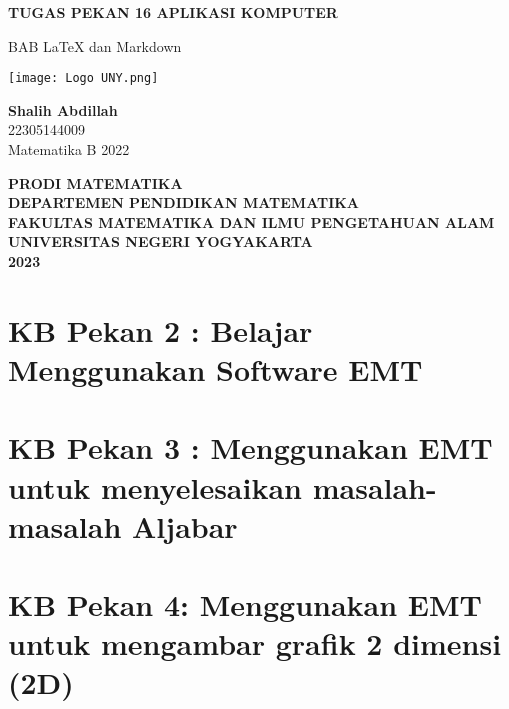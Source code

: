 \documentclass{report}
\begin{document}
\begin{titlepage}
    \begin{center}
        \vspace*{0,2cm}

        \Huge
        \textbf{TUGAS PEKAN 16 APLIKASI KOMPUTER}
        
        \vspace{1cm}
        
        \LARGE
        BAB LaTeX dan Markdown  
        
        \vspace{1cm}
        
        \texttt{[image: Logo UNY.png]}

        \vspace{1cm}
        
        \textbf{Shalih Abdillah}\\
        22305144009\\
        Matematika B 2022
        
        \vspace{2cm}
        
        \Large
        \textbf{PRODI MATEMATIKA}\\
        \textbf{DEPARTEMEN PENDIDIKAN MATEMATIKA}\\
        \textbf{FAKULTAS MATEMATIKA DAN ILMU PENGETAHUAN ALAM}
        \textbf{UNIVERSITAS NEGERI YOGYAKARTA}\\
        \textbf{2023}
        
    \end{center}
\end{titlepage}

\newpage
\tableofcontents

\chapter{KB Pekan 2 : Belajar Menggunakan Software EMT}


\newpage
\chapter{KB Pekan 3 : Menggunakan EMT untuk menyelesaikan masalah-masalah Aljabar}


\newpage
\chapter{KB Pekan 4: Menggunakan EMT untuk mengambar grafik 2 dimensi (2D)}

\end{document}
